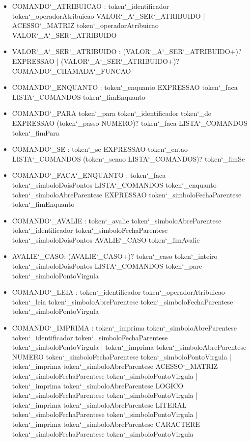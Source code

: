 \documentclass[
12pt,				%
a4paper,			%
english,			%
french,				%
spanish,			%
brazil,				%
article
]{abntex2}
\begin{document}
\begin{itemize}
	\item COMANDO\char`_ATRIBUICAO : token\char`_identificador token\char`_operadorAtribuicao VALOR\char`_A\char`_SER\char`_ATRIBUIDO | ACESSO\char`_MATRIZ token\char`_operadorAtribuicao VALOR\char`_A\char`_SER\char`_ATRIBUIDO
	\item VALOR\char`_A\char`_SER\char`_ATRIBUIDO : (VALOR\char`_A\char`_SER\char`_ATRIBUIDO+)? EXPRESSAO |  (VALOR\char`_A\char`_SER\char`_ATRIBUIDO+)? COMANDO\char`_CHAMADA\char`_FUNCAO
	\item COMANDO\char`_ENQUANTO : token\char`_enquanto EXPRESSAO token\char`_faca LISTA\char`_COMANDOS token\char`_fimEnquanto
	\item COMANDO\char`_PARA token\char`_para token\char`_identificador token\char`_de EXPRESSAO (token\char`_passo NUMERO)? token\char`_faca LISTA\char`_COMANDOS token\char`_fimPara
	\item COMANDO\char`_SE : token\char`_se EXPRESSAO token\char`_entao LISTA\char`_COMANDOS (token\char`_senao LISTA\char`_COMANDOS)? token\char`_fimSe
	\item COMANDO\char`_FACA\char`_ENQUANTO : token\char`_faca token\char`_simboloDoisPontos LISTA\char`_COMANDOS token\char`_enquanto token\char`_simboloAbreParentese EXPRESSAO token\char`_simboloFechaParentese token\char`_fimEnquanto
	\item COMANDO\char`_AVALIE : token\char`_avalie token\char`_simboloAbreParentese token\char`_identificador token\char`_simboloFechaParentese token\char`_simboloDoisPontos AVALIE\char`_CASO token\char`_fimAvalie
	\item AVALIE\char`_CASO: (AVALIE\char`_CASO+)? token\char`_caso token\char`_inteiro token\char`_simboloDoisPontos LISTA\char`_COMANDOS token\char`_pare token\char`_simboloPontoVirgula
	\item COMANDO\char`_LEIA : token\char`_identificador token\char`_operadorAtribuicao token\char`_leia token\char`_simboloAbreParentese token\char`_simboloFechaParentese token\char`_simboloPontoVirgula
	
	\item COMANDO\char`_IMPRIMA : token\char`_imprima token\char`_simboloAbreParentese token\char`_identificador token\char`_simboloFechaParentese token\char`_simboloPontoVirgula | token\char`_imprima token\char`_simboloAbreParentese NUMERO token\char`_simboloFechaParentese token\char`_simboloPontoVirgula | token\char`_imprima token\char`_simboloAbreParentese ACESSO\char`_MATRIZ token\char`_simboloFechaParentese token\char`_simboloPontoVirgula | token\char`_imprima token\char`_simboloAbreParentese LOGICO token\char`_simboloFechaParentese token\char`_simboloPontoVirgula | token\char`_imprima token\char`_simboloAbreParentese LITERAL token\char`_simboloFechaParentese token\char`_simboloPontoVirgula | token\char`_imprima token\char`_simboloAbreParentese CARACTERE token\char`_simboloFechaParentese token\char`_simboloPontoVirgula
	 

\end{itemize}
\end{document}
